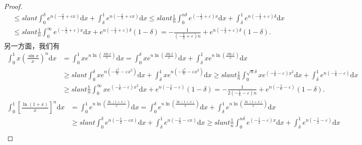 \documentclass[../../main.tex]{subfiles}
\begin{document}
\begin{proof}
\begin{align*}
&\leqslant slant \int_0^{\delta}{e^{n\left( -\frac{x}{2}+\varepsilon x \right)}\mathrm{d}x}+\int_{\delta}^1{e^{n\left( -\frac{x}{2}+\varepsilon x \right)}\mathrm{d}x}\leqslant slant \frac{1}{n}\int_0^{n\delta}{e^{\left( -\frac{1}{2}+\varepsilon \right) x}\mathrm{d}x}+\int_{\delta}^1{e^{n\left( -\frac{1}{2}+\varepsilon \right) \delta}\mathrm{d}x}\\
&\leqslant slant \frac{1}{n}\int_0^{\infty}{e^{\left( -\frac{1}{2}+\varepsilon \right) x}\mathrm{d}x}+e^{n\left( -\frac{1}{2}+\varepsilon \right) \delta}\left( 1-\delta \right) =-\frac{1}{\left( -\frac{1}{2}+\varepsilon \right) n}+e^{n\left( -\frac{1}{2}+\varepsilon \right) \delta}\left( 1-\delta \right) .
\end{align*}
另一方面，我们有
\begin{align*}
\int_0^1{x\left( \frac{\sin x}{x} \right) ^n\mathrm{d}x}&=\int_0^1{xe^{n\ln \left( \frac{\sin x}{x} \right)}\mathrm{d}x}=\int_0^{\delta}{xe^{n\ln \left( \frac{\sin x}{x} \right)}\mathrm{d}x}+\int_{\delta}^1{xe^{n\ln \left( \frac{\sin x}{x} \right)}\mathrm{d}x}\\
&\geqslant slant \int_0^{\delta}{xe^{n\left( -\frac{x^2}{6}-\varepsilon x^2 \right)}\mathrm{d}x}+\int_{\delta}^1{xe^{n\left( -\frac{x^2}{6}-\varepsilon x^2 \right)}\mathrm{d}x}\geqslant slant \frac{1}{n}\int_0^{\sqrt{n}\delta}{xe^{\left( -\frac{1}{6}-\varepsilon \right) x^2}\mathrm{d}x}+\int_{\delta}^1{e^{n\left( -\frac{1}{6}-\varepsilon \right)}\mathrm{d}x}\\
&\geqslant slant \frac{1}{n}\int_0^{\infty}{xe^{\left( -\frac{1}{6}-\varepsilon \right) x^2}\mathrm{d}x}+e^{n\left( -\frac{1}{6}-\varepsilon \right)}\left( 1-\delta \right) =-\frac{1}{2\left( -\frac{1}{6}-\varepsilon \right) n}+e^{n\left( -\frac{1}{6}-\varepsilon \right)}\left( 1-\delta \right) .
\end{align*}
\begin{align*}
\int_0^1{\left[ \frac{\ln \left( 1+x \right)}{x} \right] ^n\mathrm{d}x}&=\int_0^1{e^{n\ln \left( \frac{\ln \left( 1+x \right)}{x} \right)}\mathrm{d}x}=\int_0^{\delta}{e^{n\ln \left( \frac{\ln \left( 1+x \right)}{x} \right)}\mathrm{d}x}+\int_{\delta}^1{e^{n\ln \left( \frac{\ln \left( 1+x \right)}{x} \right)}\mathrm{d}x}\\
&\geqslant slant \int_0^{\delta}{e^{n\left( -\frac{x}{2}-\varepsilon x \right)}\mathrm{d}x}+\int_{\delta}^1{e^{n\left( -\frac{x}{2}-\varepsilon x \right)}\mathrm{d}x}\geqslant slant \frac{1}{n}\int_0^{n\delta}{e^{\left( -\frac{1}{2}-\varepsilon \right) x}\mathrm{d}x}+\int_{\delta}^1{e^{n\left( -\frac{1}{2}-\varepsilon \right)}\mathrm{d}x}\\

\end{align*}
\end{proof}
\end{document}

